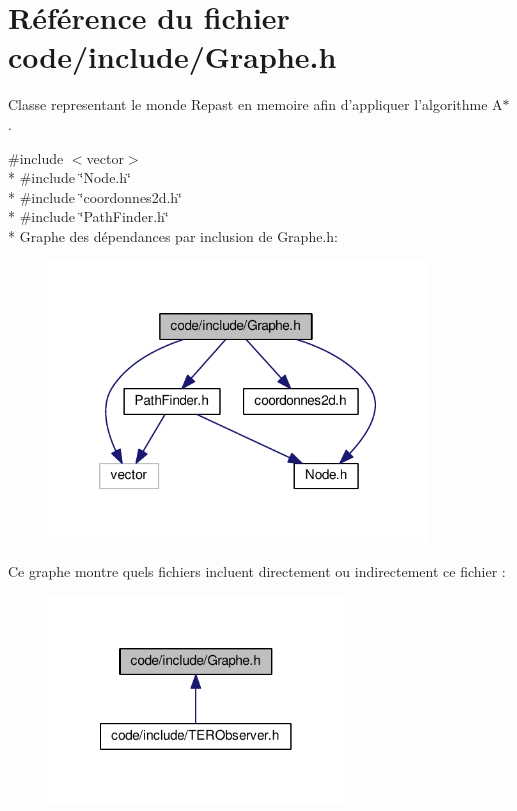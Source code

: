 \section{Référence du fichier code/include/\-Graphe.h}
\label{_graphe_8h}


Classe representant le monde Repast en memoire afin d'appliquer l'algorithme A$\ast$.  


{\ttfamily \#include $<$vector$>$}\\*
{\ttfamily \#include \char`\"{}Node.\-h\char`\"{}}\\*
{\ttfamily \#include \char`\"{}coordonnes2d.\-h\char`\"{}}\\*
{\ttfamily \#include \char`\"{}Path\-Finder.\-h\char`\"{}}\\*
Graphe des dépendances par inclusion de Graphe.\-h\-:
\nopagebreak
\begin{figure}[H]
\begin{center}
\leavevmode
\includegraphics[width=286pt]{_graphe_8h__incl}
\end{center}
\end{figure}
Ce graphe montre quels fichiers incluent directement ou indirectement ce fichier \-:
\nopagebreak
\begin{figure}[H]
\begin{center}
\leavevmode
\includegraphics[width=222pt]{_graphe_8h__dep__incl}
\end{center}
\end{figure}
